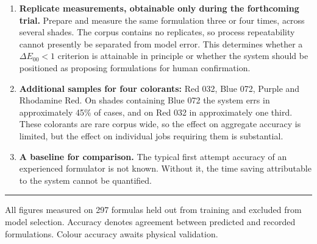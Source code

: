 \documentclass[11pt,a4paper]{article}
\begin{document}
\begin{enumerate}[leftmargin=*,itemsep=6pt]

\item \textbf{Replicate measurements, obtainable only during the forthcoming
trial.} Prepare and measure the same formulation three or four times, across
several shades. The corpus contains no replicates, so process repeatability
cannot presently be separated from model error. This determines whether a
$\Delta E_{00} < 1$ criterion is attainable in principle or whether the system
should be positioned as proposing formulations for human confirmation.

\item \textbf{Additional samples for four colorants:} Red 032, Blue 072, Purple
and Rhodamine Red. On shades containing Blue 072 the system errs in approximately
45\% of cases, and on Red 032 in approximately one third. These colorants are
rare corpus wide, so the effect on aggregate accuracy is limited, but the effect
on individual jobs requiring them is substantial.

\item \textbf{A baseline for comparison.} The typical first attempt accuracy of an
experienced formulator is not known. Without it, the time saving attributable to
the system cannot be quantified.

\end{enumerate}

\vspace{6pt}
\hrule
\vspace{6pt}
\footnotesize
\noindent
All figures measured on 297 formulas held out from training and excluded from
model selection. Accuracy denotes agreement between predicted and recorded
formulations. Colour accuracy awaits physical validation.
\end{document}
